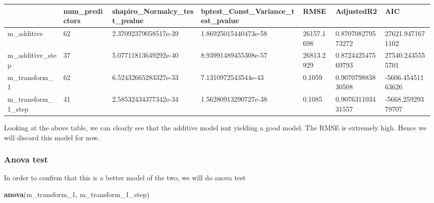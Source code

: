 \documentclass[
]{article}
\newenvironment{Shaded}{\begin{snugshade}}{\end{snugshade}}
\newcommand{\DecValTok}[1]{\textcolor[rgb]{0.00,0.00,0.81}{#1}}
\newcommand{\KeywordTok}[1]{\textcolor[rgb]{0.13,0.29,0.53}{\textbf{#1}}}
\newcommand{\NormalTok}[1]{#1}
\begin{document}
\begin{tabular}{l|l|l|l|l|l|l}
\hline
  & num\_predictors & shapiro\_Normalcy\_test\_pvalue & bptest\_Const\_Variance\_test\_pvalue & RMSE & AdjustedR2 & AIC\\
\hline
m\_additive & 62 & 2.37092379058517e-39 & 1.86925015440473e-58 & 26157.1698 & 0.870708279573272 & 27621.9471671102\\
\hline
m\_additive\_step & 37 & 5.07711813649292e-40 & 8.93991489455308e-57 & 26813.2929 & 0.872442547569793 & 27540.2435555701\\
\hline
m\_transform\_1 & 62 & 6.52432665283327e-33 & 7.1310972543544e-43 & 0.1059 & 0.907079883830508 & -5606.45451163626\\
\hline
m\_transform\_1\_step & 41 & 2.58532434377342e-34 & 1.56280913290727e-38 & 0.1085 & 0.907631103431557 & -5668.25929379707\\
\hline
\end{tabular}

Looking at the above table, we can clearly see that the additive model isnt yielding a good model. The RMSE is extremely high. Hence we will discard this model for now.

\hypertarget{anova-test}{%
\subsubsection{Anova test}\label{anova-test}}

In order to confirm that this is a better model of the two, we will do anova test

\begin{Shaded}
\begin{Highlighting}[]
\KeywordTok{anova}\NormalTok{(m_transform_}\DecValTok{1}\NormalTok{, m_transform_}\DecValTok{1}\NormalTok{_step)}
\end{Highlighting}
\end{Shaded}
\end{document}
